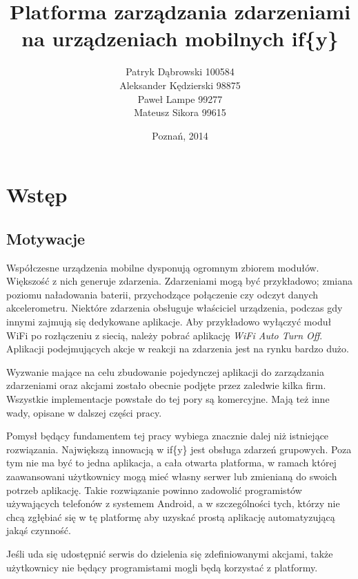\documentclass[11pt,a4paper,polish,thesis]{dcsbook}
\begin{document}
\author{Patryk Dąbrowski 100584\\ Aleksander Kędzierski 98875\\ Paweł Lampe 99277\\ Mateusz Sikora 99615}
\title{Platforma zarządzania zdarzeniami na urządzeniach mobilnych if\{y\}}
\date{Poznań, 2014}

\maketitle

\frontmatter

\tableofcontents{}

\mainmatter

\chapter{Wstęp}
\section{Motywacje}
Współczesne urządzenia mobilne dysponują ogromnym zbiorem modułów. Większość z nich generuje zdarzenia. Zdarzeniami mogą być przykładowo; zmiana poziomu naładowania
baterii, przychodzące połączenie czy odczyt danych akcelerometru. Niektóre zdarzenia obsługuje właściciel urządzenia, podczas gdy innymi zajmują się dedykowane
aplikacje. Aby przykładowo wyłączyć moduł WiFi po rozłączeniu z siecią, należy pobrać aplikację \emph{WiFi Auto Turn Off}. Aplikacji podejmujących akcje w reakcji
na zdarzenia jest na rynku bardzo dużo.

Wyzwanie mające na celu zbudowanie pojedynczej aplikacji do zarządzania zdarzeniami oraz akcjami zostało obecnie podjęte przez zaledwie kilka firm. Wszystkie
implementacje powstałe do tej pory są komercyjne. Mają też inne wady, opisane w dalszej części pracy.

Pomysł będący fundamentem tej pracy wybiega znacznie dalej niż istniejące rozwiązania. Największą innowacją w if\{y\} jest obsługa zdarzeń grupowych. Poza tym nie
ma być to jedna aplikacja, a cała otwarta platforma, w ramach której zaawansowani użytkownicy mogą mieć własny serwer lub zmienianą do swoich potrzeb aplikację.
Takie rozwiązanie powinno zadowolić programistów używających telefonów z systemem Android, a w szczególności tych, którzy nie chcą zgłębiać się w tę platformę
aby uzyskać prostą aplikację automatyzującą jakąś czynność.

Jeśli uda się udostępnić serwis do dzielenia się zdefiniowanymi akcjami, także użytkownicy nie będący programistami mogli będą korzystać z platformy.
\end{document}

